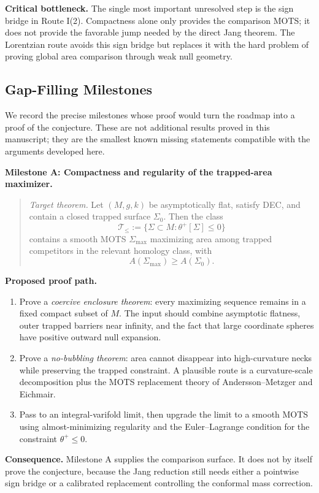 \textbf{Critical bottleneck.} The single most important unresolved step is the sign bridge in Route I(2). Compactness alone only provides the comparison MOTS; it does not provide the favorable jump needed by the direct Jang theorem. The Lorentzian route avoids this sign bridge but replaces it with the hard problem of proving global area comparison through weak null geometry.

\subsection{Gap-Filling Milestones}

We record the precise milestones whose proof would turn the roadmap into a proof of the conjecture. These are not additional results proved in this manuscript; they are the smallest known missing statements compatible with the arguments developed here.

\textbf{Milestone A: Compactness and regularity of the trapped-area maximizer.}
\begin{quote}
\emph{Target theorem.} Let $(M,g,k)$ be asymptotically flat, satisfy DEC, and contain a closed trapped surface $\Sigma_0$. Then the class
\[
    \mathcal T_{\le}:=\{\Sigma\subset M:\theta^+[\Sigma]\le0\}
\]
contains a smooth MOTS $\Sigma_{\max}$ maximizing area among trapped competitors in the relevant homology class, with
\[
    A(\Sigma_{\max})\ge A(\Sigma_0).
\]
\end{quote}

\textbf{Proposed proof path.}
\begin{enumerate}
    \item Prove a \emph{coercive enclosure theorem}: every maximizing sequence remains in a fixed compact subset of $M$. The input should combine asymptotic flatness, outer trapped barriers near infinity, and the fact that large coordinate spheres have positive outward null expansion.
    \item Prove a \emph{no-bubbling theorem}: area cannot disappear into high-curvature necks while preserving the trapped constraint. A plausible route is a curvature-scale decomposition plus the MOTS replacement theory of Andersson--Metzger and Eichmair.
    \item Pass to an integral-varifold limit, then upgrade the limit to a smooth MOTS using almost-minimizing regularity and the Euler--Lagrange condition for the constraint $\theta^+\le0$.
\end{enumerate}

\textbf{Consequence.} Milestone A supplies the comparison surface. It does not by itself prove the conjecture, because the Jang reduction still needs either a pointwise sign bridge or a calibrated replacement controlling the conformal mass correction.

